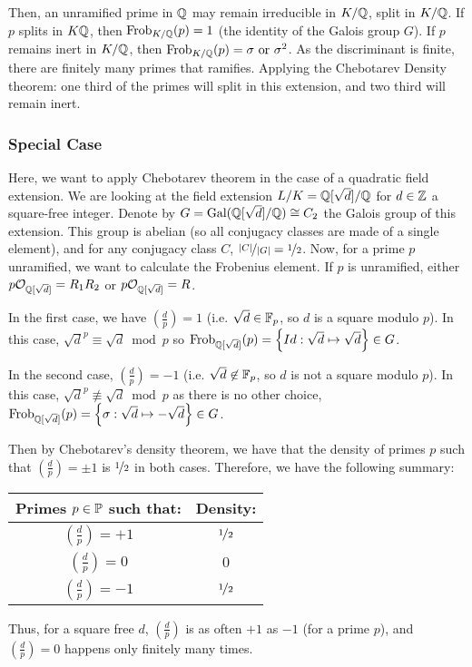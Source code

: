 Then, an unramified prime in $\mathbb{Q}$ may remain irreducible in $K/\mathbb{Q}$, split in $K/\mathbb{Q}$.
If $p$ splits in $K\mathbb{Q}$, then $\text{Frob}_{K/\mathbb{Q}}(p)=1$ (the identity of the Galois group $G$).
If $p$ remains inert in $K/\mathbb{Q}$, then $\text{Frob}_{K/\mathbb{Q}}(p)=\sigma \text{ or } \sigma^2$.
As the discriminant is finite, there are finitely many primes that ramifies.
Applying the Chebotarev Density theorem: one third of the primes will split in this extension, and two third will remain inert.

\subsubsection{Special Case}
Here, we want to apply Chebotarev theorem in the case of a quadratic field extension.
We are looking at the field extension $L/K = \mathbb{Q}[\sqrt{d}]/\mathbb{Q}$ for $d \in \mathbb{Z}$ a square-free integer.
Denote by $G = \text{Gal}(\mathbb{Q}[\sqrt{d}]/\mathbb{Q}) \cong C_2$ the Galois group of this extension.
This group is abelian (so all conjugacy classes are made of a single element), and for any conjugacy class $C$, $\nicefrac{|C|}{|G|} = \nicefrac{1}{2}$.
Now, for a prime $p$ unramified, we want to calculate the Frobenius element.
If $p$ is unramified, either $p \mathcal{O}_{\mathbb{Q}[\sqrt{d}]} = R_1R_2$ or $p \mathcal{O}_{\mathbb{Q}[\sqrt{d}]} = R$.

In the first case, we have $\left( \frac{d}{p} \right) = 1$ (i.e. $\sqrt{d} \in \mathbb{F}_p$, so $d$ is a square modulo $p$).
In this case, $\sqrt{d}^p \equiv \sqrt{d} \bmod p$ so $\text{Frob}_{\mathbb{Q}[\sqrt{d}]}(p) = \left\lbrace Id: \sqrt{d} \mapsto \sqrt{d} \right\rbrace \in G$.

In the second case, $\left( \frac{d}{p} \right) = -1$ (i.e. $\sqrt{d} \not\in \mathbb{F}_p$, so $d$ is not a square modulo $p$).
In this case, $\sqrt{d}^p \not\equiv \sqrt{d} \bmod p$ as there is no other choice, $\text{Frob}_{\mathbb{Q}[\sqrt{d}]}(p) = \left\lbrace \sigma: \sqrt{d} \mapsto -\sqrt{d} \right\rbrace \in G$.

Then by Chebotarev's density theorem, we have that the density of primes $p$ such that $\left( \frac{d}{p} \right) = \pm1$ is $\nicefrac{1}{2}$ in both cases.
Therefore, we have the following summary:
\begin{center}
	\begin{tabular}{|c|c|}
		\hline
		Primes $p \in \mathbb{P}$ such that: & Density:\\
		\hline
		$\left( \frac{d}{p} \right) = +1$ & $\nicefrac{1}{2}$\\
		$\left( \frac{d}{p} \right) =  0$ & $0$\\
		$\left( \frac{d}{p} \right) = -1$ & $\nicefrac{1}{2}$\\
		\hline
	\end{tabular}
\end{center}
Thus, for a square free $d$, $\left( \frac{d}{p} \right)$ is as often $+1$ as $-1$ (for a prime $p$), and  $\left( \frac{d}{p} \right) = 0$ happens only finitely many times.



